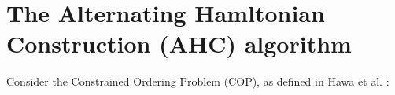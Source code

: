 \documentclass{elsarticle}
\begin{document}
\begin{comment}
{\color{myOrange}
\begin{itemize}[leftmargin=*]
	\item
	\idone{Lit review, Becker \cite{becker2015}, Lewis \cite{lewis2011} (Lewis TSP method), Hawa \cite{hawa2018}, cite Garraffa \cite{garraffa2016}.}
	\idone{MGPs, cite Lewis \cite{lewis2009}, general formula.}
	\idone{Formal definition COP, vicinal sum constraint.}
	\idone{Example instance $\mathcal{M}$ of COP and possible solution $\mathcal{T}$ using constraint value $\tau = 7$.}
	\idone{Description of subproblem, pack from left to right, minimum scoring distance, single strip problem.}
	\idone{Cite Goulimis \cite{goulimis2004}.}
	\idone{$a_i, b_i, w_i, \mathcal{I}, \mathcal{I}', W, H, \tau, |\mathcal{I}| = n$.}
	\idone{$\tau$ = 70mm approx in industry.}
	\idone{$(a_i, b_i)$, $(b_i, a_i)$ orientations (regular and rotated).}
	\idone{Outermost score widths/elements ignored.}
	\idone{Need to decide order and orientation of items on strip.}
	\idone{$2^{n-1} n!$ distinct orderings, combinatorial explosion.}
	\idone{Show that the subproblem is equivalent to the COP, minimum scoring distance = VSC.}
	\idone{COP/subproblem the strips have infinite width, what if finite width?}
	\idone{Formal defintion of SCSPP, multistrip problem.}
	\idone{Need to decide which strip to pack each item, and \emph{how}, i.e. what order and orientation should the items be in.}
	\idone{BPP special case of SCSPP with $\tau = 0$.}
	\idone{Items can be run through machine individually but extra time/cost.}
	\idone{Two phase approach, EA then postopt, Malaguti \cite{malaguti2008}.}
	\idone{Call the two phase process EAX?}
	\idone{Polynomial-time algorithm for COP Becker \cite{becker2010} Hawa \cite{hawa2018}}
	\idone{Describe rest of paper/layout.}
	\idone{TPP/SDCL ordering still feasible, just not optimal, SCSPP ordering may not be feasible.}
\end{itemize}
}
\end{comment}

\section{The Alternating Hamltonian Construction (AHC) algorithm}
\label{sec:ahc}
\noindent Consider the Constrained Ordering Problem (COP), as defined in Hawa et al. \cite{hawa2018}:
\end{document}
